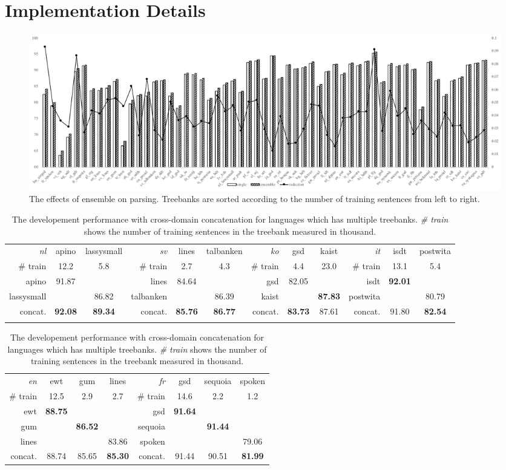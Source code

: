 \documentclass[11pt,a4paper]{article}
\begin{document}
\section{Implementation Details}
\begin{figure}[t]
	\includegraphics[width=\textwidth]{effects_elmo_ensemble}
	\caption{The effects of ensemble on parsing.
		Treebanks are sorted according to the number of training sentences from left to right.}\label{fig:elmo-effect-ens}
\end{figure}
\begin{table}[t]
	\centering
	\small
	\setlength{\tabcolsep}{5pt}
	\begin{tabular}{rcc || rcc || rcc || rcc}
		\textit{nl} & apino & lassysmall & \textit{sv} & lines & talbanken & \textit{ko} & gsd & kaist & \textit{it} & isdt & postwita \\
		\# train & 12.2 & 5.8 & \# train & 2.7 & 4.3 & \# train & 4.4 & 23.0 & \# train & 13.1 & 5.4 \\
		\hline
		apino & 91.87 & & lines & 84.64 & & gsd & 82.05 & & isdt & \textbf{92.01} & \\
		lassysmall & & 86.82 & talbanken & & 86.39 & kaist & & \textbf{87.83} & postwita & & 80.79 \\
		\hline
		concat. & \textbf{92.08} & \textbf{89.34} & concat. & \textbf{85.76} & \textbf{86.77} & concat. & \textbf{83.73} & 87.61 & concat.& 91.80 & \textbf{82.54} \\
		\vspace*{0.5em}
	\end{tabular}
	\begin{tabular}{rccc || rccc}
		\textit{en} & ewt & gum & lines & \textit{fr} & gsd & sequoia & spoken \\
		\# train & 12.5 & 2.9 & 2.7 & \# train & 14.6 & 2.2 & 1.2\\
		\hline
		ewt & \textbf{88.75} & & & gsd & \textbf{91.64} & & \\
		gum & & \textbf{86.52} & & sequoia & & \textbf{91.44} & \\
		lines & & & 83.86 & spoken & & & 79.06 \\
		\hline
		concat. & 88.74 & 85.65 & \textbf{85.30} & concat. & 91.44 & 90.51 & \textbf{81.99} \\
	\end{tabular}
	\caption{The developement performance with cross-domain concatenation for languages which has multiple treebanks.
		\textit{\# train} shows the number of training sentences in the treebank measured in thousand.}\label{tbl:confuse-mat}
\end{table}
\end{document}
